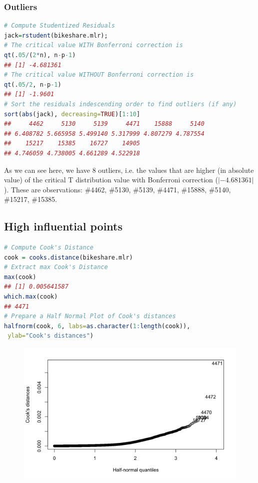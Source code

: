 \documentclass[11pt,a4paper]{article}
\begin{document}
\subsubsection{Outliers}
\begin{lstlisting}[language=R]
# Compute Studentized Residuals
jack=rstudent(bikeshare.mlr);
# The critical value WITH Bonferroni correction is
qt(.05/(2*n), n-p-1) 
## [1] -4.681361
# The critical value WITHOUT Bonferroni correction is
qt(.05/2, n-p-1)
## [1] -1.9601
# Sort the residuals indescending order to find outliers (if any)
sort(abs(jack), decreasing=TRUE)[1:10]
##     4462     5130     5139     4471    15888     5140
## 6.408782 5.665958 5.499140 5.317999 4.807279 4.787554
##    15217    15385    16727    14905
## 4.746059 4.738005 4.661289 4.522918
\end{lstlisting}
As we can see here, we have 8 outliers, i.e. the values that are higher (in absolute value) of the critical T distribution value with Bonferroni correction ($|-4.681361|$). These are observations: \#4462, \#5130, \#5139, \#4471, \#15888, \#5140, \#15217, \#15385.

\subsection{High influential points}
\begin{lstlisting}[language=R]
# Compute Cook's Distance
cook = cooks.distance(bikeshare.mlr)
# Extract max Cook's Distance
max(cook)
## [1] 0.005641587
which.max(cook)
## 4471
# Prepare a Half Normal Plot of Cook's distances
halfnorm(cook, 6, labs=as.character(1:length(cook)),
 ylab="Cook's distances")
\end{lstlisting}
\begin{center}\begin{figure}[htbp]
  \centering
  \includegraphics[scale=0.3]{week403.png}
  \caption{}
  \label{}
\end{figure}\end{center}
\end{document}
